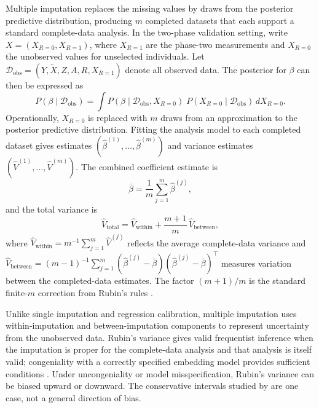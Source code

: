 Multiple imputation \citep{Rubin1987} replaces the missing values by draws from the posterior predictive distribution, producing $m$ completed datasets that each support a standard complete-data analysis. In the two-phase validation setting, write $X = (X_{R=0}, X_{R=1})$, where $X_{R=1}$ are the phase-two measurements and $X_{R=0}$ the unobserved values for unselected individuals. Let $\mathcal{D}_{\mathrm{obs}}=(Y,\tilde{X},Z,A,R,X_{R=1})$ denote all observed data. The posterior for $\beta$ can then be expressed as
\begin{equation}
    P(\beta \mid \mathcal{D}_{\mathrm{obs}})
    = \int P(\beta \mid \mathcal{D}_{\mathrm{obs}}, X_{R=0})\;
    P(X_{R=0} \mid \mathcal{D}_{\mathrm{obs}})\, dX_{R=0}.
    \label{eq:mi_posterior}
\end{equation}
Operationally, $X_{R=0}$ is replaced with $m$ draws from an approximation to the posterior predictive distribution. Fitting the analysis model to each completed dataset gives estimates $(\hat{\beta}^{(1)}, \ldots, \hat{\beta}^{(m)})$ and variance estimates $(\hat{V}^{(1)}, \ldots, \hat{V}^{(m)})$. The combined coefficient estimate is
\begin{equation}
    \bar{\beta} = \frac{1}{m} \sum_{j=1}^{m} \hat{\beta}^{(j)},
    \label{eq:mi_point}
\end{equation}
and the total variance is
\begin{equation}
    \hat{V}_{\mathrm{total}}
    = \hat{V}_{\mathrm{within}}
    + \frac{m+1}{m}\, \hat{V}_{\mathrm{between}},
    \label{eq:mi_var}
\end{equation}
where $\hat{V}_{\mathrm{within}} = m^{-1} \sum_{j=1}^{m} \hat{V}^{(j)}$ reflects the average complete-data variance and $\hat{V}_{\mathrm{between}} = (m-1)^{-1} \sum_{j=1}^{m} (\hat{\beta}^{(j)} - \bar{\beta})(\hat{\beta}^{(j)} - \bar{\beta})^{\top}$ measures variation between the completed-data estimates. The factor $(m+1)/m$ is the standard finite-$m$ correction from Rubin's rules \citep{Rubin1987}.

Unlike single imputation and regression calibration, multiple imputation uses within-imputation and between-imputation components to represent uncertainty from the unobserved data. Rubin's variance gives valid frequentist inference when the imputation is proper for the complete-data analysis and that analysis is itself valid; congeniality with a correctly specified embedding model provides sufficient conditions \citep{meng1994multiple}. Under uncongeniality or model misspecification, Rubin's variance can be biased upward or downward. The conservative intervals studied by \citet{fay1992inferences} are one case, not a general direction of bias.

